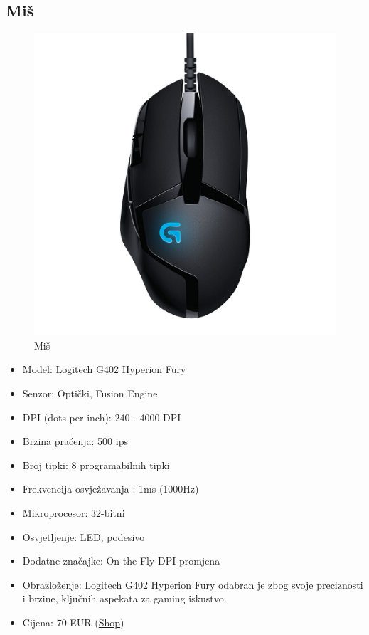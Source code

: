 \documentclass{article}
\begin{document}
\subsection{Miš}
\begin{figure}[H]
    \centering
    \includegraphics[width = \textwidth]{Slike/G402.jpg}
    \caption{Miš}
    \label{fig:Miš}
\end{figure}
\begin{itemize}
    \item Model: Logitech G402 Hyperion Fury
    \item Senzor: Optički, Fusion Engine
    \item DPI (dots per inch): 240 - 4000 DPI
    \item Brzina praćenja: 500 ips
    \item Broj tipki: 8 programabilnih tipki
    \item Frekvencija osvježavanja : 1ms (1000Hz)
    \item Mikroprocesor: 32-bitni
    \item Osvjetljenje: LED, podesivo
    \item Dodatne značajke: On-the-Fly DPI promjena
    \item Obrazloženje: Logitech G402 Hyperion Fury odabran je zbog svoje preciznosti i brzine, ključnih aspekata za gaming iskustvo.
    \item Cijena: 70 EUR (\href{https://www.links.hr/hr/mis-logitech-gaming-g402-hyperion-fury-deltazero-4000dpi-crni-usb-101503412}{Shop})
\end{itemize}
\end{document}
